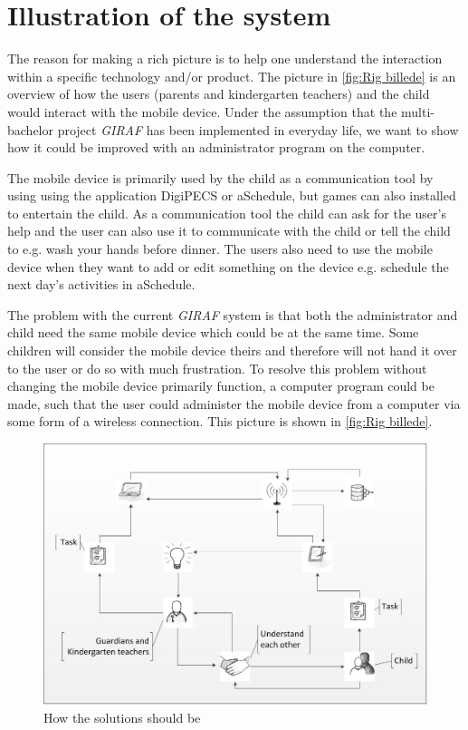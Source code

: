 \section{Illustration of the system}
The reason for making a rich picture is to help one understand the interaction within a specific technology and/or product\cite{OOAD}. The picture in \vref{fig:Rig billede} is an overview of how the users (parents and kindergarten teachers) and the child would interact with the mobile device. Under the assumption that the multi-bachelor project \textit{GIRAF} has been implemented in everyday life, we want to show how it could be improved with an administrator program on the computer.

The mobile device is primarily used by the child as a communication tool by using using the application DigiPECS or aSchedule, but games can also installed to entertain the child. As a communication tool the child can ask for the user's help and the user can also use it to communicate with the child or tell the child to e.g. wash your hands before dinner. 
The users also need to use the mobile device when they want to add or edit something on the device e.g. schedule the next day's activities in aSchedule.  

 
The problem with the current \textit{GIRAF} system is that both the administrator and child need the same mobile device which could be at the same time. Some children will consider the mobile device theirs and therefore will not hand it over to the user or do so with much frustration. To resolve this problem without changing the mobile device primarily function, a computer program could be made, such that the user could administer the mobile device from a computer via some form of a wireless connection. This picture is shown in \vref{fig:Rig billede}. 

\begin{figure}[ht]
	\centering
		\includegraphics[width=1.00\textwidth]{img/Rig_billede2.jpg}
	\caption{How the solutions should be}
	\label{fig:Rig billede}
\end{figure}

